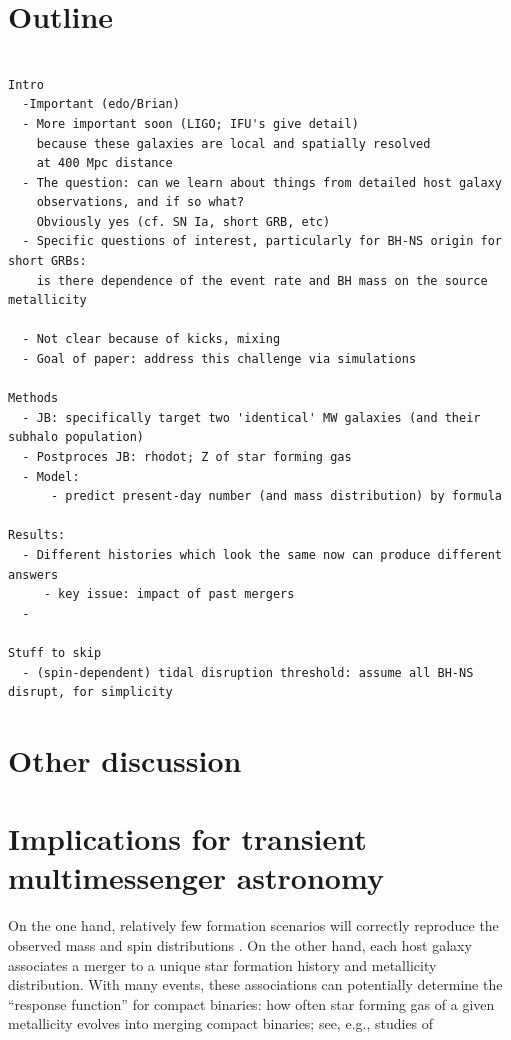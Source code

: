 \documentclass[nofootinbib,twocolumn,prd]{emulateapj}
\begin{document}
\section{Outline }
\begin{verbatim}

Intro
  -Important (edo/Brian)
  - More important soon (LIGO; IFU's give detail)
    because these galaxies are local and spatially resolved
    at 400 Mpc distance
  - The question: can we learn about things from detailed host galaxy 
    observations, and if so what?
    Obviously yes (cf. SN Ia, short GRB, etc)
  - Specific questions of interest, particularly for BH-NS origin for short GRBs:
    is there dependence of the event rate and BH mass on the source metallicity

  - Not clear because of kicks, mixing
  - Goal of paper: address this challenge via simulations

Methods
  - JB: specifically target two 'identical' MW galaxies (and their subhalo population)
  - Postproces JB: rhodot; Z of star forming gas
  - Model:
      - predict present-day number (and mass distribution) by formula 

Results:
  - Different histories which look the same now can produce different answers
     - key issue: impact of past mergers
  - 

Stuff to skip
  - (spin-dependent) tidal disruption threshold: assume all BH-NS disrupt, for simplicity
\end{verbatim}


\section{Other discussion}


\section{Implications for transient multimessenger astronomy}



On the one hand,  relatively few formation scenarios will correctly reproduce the observed mass and spin distributions
\citep{2004MNRAS.352.1372B,2003ApJ...589L..37B,gwastro-Ilya-ConfProc-NRDA-2010}.  
On the other hand, each host galaxy associates a merger to a unique star formation history and metallicity distribution.
With many events, these associations can potentially determine the ``response function'' for compact binaries: how often star forming gas of a given metallicity evolves into
merging compact binaries;  see, e.g., studies of
\end{document}
